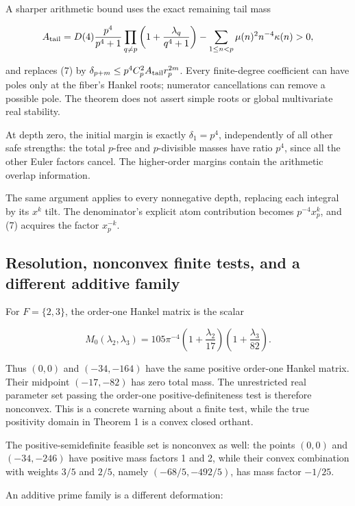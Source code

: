 A sharper arithmetic bound uses the exact remaining tail mass

\[
A_{\rm tail}=D(4)\frac{p^4}{p^4+1}
\prod_{q\ne p}\left(1+\frac{\lambda_q}{q^4+1}\right)
-\sum_{1\le n<p}\mu(n)^2n^{-4}\kappa(n)>0,
\]

and replaces (7) by \(\delta_{p+m}\le p^4 C_p^2 A_{\rm tail}r_p^{2m}\).
Every finite-degree coefficient can have poles only at the fiber's
Hankel roots; numerator cancellations can remove a possible pole. The
theorem does not assert simple roots or global multivariate real
stability.

At depth zero, the initial margin is exactly \(\delta_1=p^4\),
independently of all other safe strengths: the total \(p\)-free and
\(p\)-divisible masses have ratio \(p^4\), since all the other Euler
factors cancel. The higher-order margins contain the arithmetic overlap
information.

The same argument applies to every nonnegative depth, replacing each
integral by its \(x^k\) tilt. The denominator's explicit atom
contribution becomes \(p^{-4}x_p^k\), and (7) acquires the factor
\(x_p^{-k}\).

\hypertarget{resolution-nonconvex-finite-tests-and-a-different-additive-family}{%
\subsection{Resolution, nonconvex finite tests, and a different additive
family}\label{resolution-nonconvex-finite-tests-and-a-different-additive-family}}

For \(F=\{2,3\}\), the order-one Hankel matrix is the scalar

\[
M_0(\lambda_2,\lambda_3)=105\pi^{-4}
\left(1+\frac{\lambda_2}{17}\right)
\left(1+\frac{\lambda_3}{82}\right).
\]

Thus \((0,0)\) and \((-34,-164)\) have the same positive order-one
Hankel matrix. Their midpoint \((-17,-82)\) has zero total mass. The
unrestricted real parameter set passing the order-one
positive-definiteness test is therefore nonconvex. This is a concrete
warning about a finite test, while the true positivity domain in Theorem
1 is a convex closed orthant.

The positive-semidefinite feasible set is nonconvex as well: the points
\((0,0)\) and \((-34,-246)\) have positive mass factors 1 and 2, while
their convex combination with weights \(3/5\) and \(2/5\), namely
\((-68/5,-492/5)\), has mass factor \(-1/25\).

An additive prime family is a different deformation:

